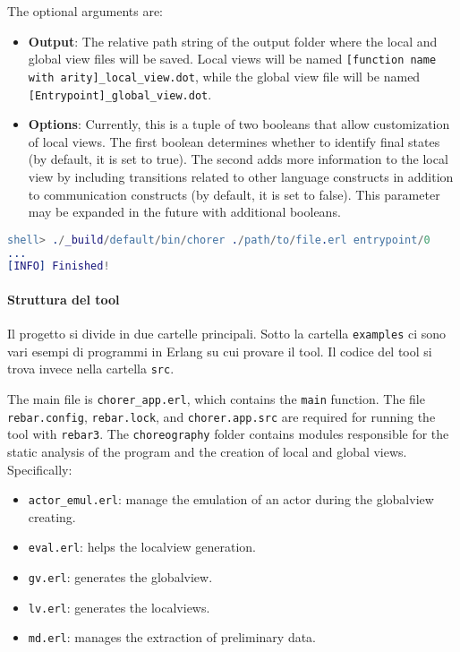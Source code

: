 \noindent The optional arguments are:
\begin{itemize}
    \item \textbf{Output}: The relative path string of the output folder where the local and global view files will be saved. Local views will be named \texttt{[function name with arity]\_local\_view.dot}, while the global view file will be named \texttt{[Entrypoint]\_global\_view.dot}.
    \item \textbf{Options}: Currently, this is a tuple of two booleans that allow customization of local views. The first boolean determines whether to identify final states (by default, it is set to true). The second adds more information to the local view by including transitions related to other language constructs in addition to communication constructs (by default, it is set to false). This parameter may be expanded in the future with additional booleans.
\end{itemize}

\begin{lstlisting}[language=Erlang, caption=Use example of the tool]
shell> ./_build/default/bin/chorer ./path/to/file.erl entrypoint/0
...
[INFO] Finished!
\end{lstlisting}

\paragraph{Struttura del tool}
Il progetto si divide in due cartelle principali. Sotto la cartella \texttt{examples} ci sono vari esempi di programmi in Erlang su cui provare il tool. Il codice del tool si trova invece nella cartella \texttt{src}. 

\bigskip


\bigskip

The main file is \texttt{chorer\_app.erl}, which contains the \texttt{main} function.  
The file \texttt{rebar.config}, \texttt{rebar.lock}, and \texttt{chorer.app.src} are required for running the tool with \texttt{rebar3}.  
The \texttt{choreography} folder contains modules responsible for the static analysis of the program and the creation of local and global views. Specifically:  
\begin{itemize}  
    \item \texttt{actor\_emul.erl}: manage the emulation of an actor during the globalview creating.
    \item \texttt{eval.erl}: helps the localview generation.  
    \item \texttt{gv.erl}: generates the globalview.  
    \item \texttt{lv.erl}: generates the localviews.  
    \item \texttt{md.erl}: manages the extraction of preliminary data.  
  \end{itemize}  

